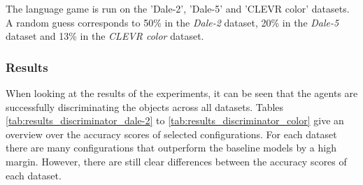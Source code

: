 The language game is run on the 'Dale-2', 'Dale-5' and 'CLEVR color' datasets.
A random guess corresponds to 50\% in the \emph{Dale-2} dataset, 20\% in the \emph{Dale-5} dataset and 13\% in the \emph{CLEVR color} dataset.

\subsubsection*{Results}
When looking at the results of the experiments, it can be seen that the agents are successfully discriminating the objects across all datasets.
Tables \ref{tab:results_discriminator_dale-2} to \ref{tab:results_discriminator_color} give an overview over the accuracy scores of selected configurations.
For each dataset there are many configurations that outperform the baseline models by a high margin.
However, there are still clear differences between the accuracy scores of each dataset.


